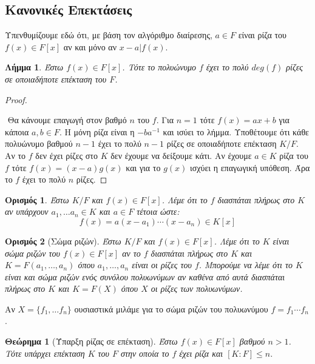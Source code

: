 \documentclass[oneside,a4paper]{article}
\newtheorem{theorem}{Θεώρημα}
\newtheorem{lemma}{Λήμμα}
\newtheorem*{defn}{Ορισμός}
\begin{document}
\subsection{Κανονικές Επεκτάσεις}

Υπενθυμίζουμε εδώ ότι, με βάση τον αλγόριθμο διαίρεσης, $a \in F$ είναι ρίζα του $f(x) \in F[x]$ αν και μόνο αν $x-a | f(x)$.

\begin{lemma}
	Έστω $f(x) \in F[x]$. Τότε το πολυώνυμο $f$ έχει το πολύ $deg(f)$ ρίζες σε οποιαδήποτε επέκταση του $F$.
\end{lemma}

\begin{proof} $ $

	$ $\newline
	Θα κάνουμε επαγωγή στον βαθμό $n$ του $f$. Για $n=1$ τότε $f(x) = ax + b$ για κάποια $a,b \in F$. Η μόνη ρίζα είναι η $-b a^{-1}$ και ισύει το λήμμα. Υποθέτουμε ότι κάθε πολυώνυμο βαθμού $n-1$ έχει το πολύ $n-1$ ρίζες σε οποιαδήποτε επέκταση $K/F$. Αν το $f$ δεν έχει ρίζες στο $K$ δεν έχουμε να δείξουμε κάτι. Αν έχουμε $a \in K$ ρίζα του $f$ τότε $f(x) = (x-a)g(x)$ και για το $g(x)$ ισχύει η επαγωγική υπόθεση. Άρα το $f$ έχει το πολύ $n$ ρίζες.
\end{proof}
\vspace{0.1cm}
\begin{defn} Έστω $K/F$ και $f(x) \in F[x]$. Λέμε ότι το $f$ διασπάται πλήρως στο $K$ αν υπάρχουν $a_1 , \ldots a_n \in K$ και $a \in F$ τέτοια ώστε:
	$$f(x) = a (x-a_1)\cdots (x-a_n) \in K[x]$$
\end{defn}
\vspace{0.1cm}
\begin{defn}[Σώμα ριζών]
	Έστω $K/F$ και $f(x) \in F[x]$. Λέμε ότι το $K$ είναι σώμα ριζών του $f(x) \in F[x]$ αν το $f$ διασπάται πλήρως στο $K$ και $K=F(a_1 , \ldots, a_n)$ όπου $a_1 ,\ldots ,a_n$ είναι οι ρίζες του $f$. Μπορούμε να λέμε ότι το $K$ είναι και σώμα ριζών ενός συνόλου πολυωνύμων αν καθένα από αυτά διασπάται πλήρως στο $K$ και $K=F(X)$ όπου $X$ οι ρίζες των πολυωνύμων.
\end{defn}
\vspace{0.1cm}
Aν $X = \{f_1 , \ldots f_n\}$ ουσιαστικά μιλάμε για το σώμα ριζών του πολυωνύμου $f = f_1 \cdots f_n$.
\vspace{0.1cm}
\begin{theorem} [Ύπαρξη ρίζας σε επέκταση] Έστω $f(x) \in F[x]$ βαθμού $n>1$. Τότε υπάρχει επέκταση $K$ του $F$ στην οποία το $f$ έχει ρίζα και $[K:F]\leq n$.
\end{theorem}
\end{document}
